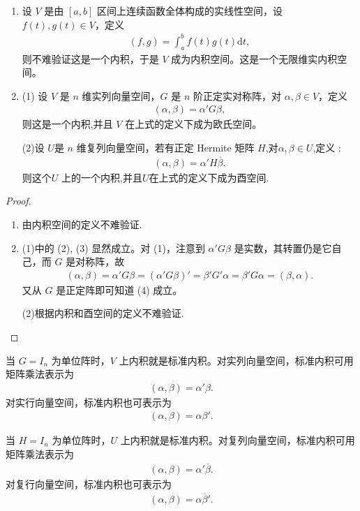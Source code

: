 \documentclass[../../main.tex]{subfiles}%
\begin{document}
\begin{example}\label{example:一些常见的内积及内积空间}
\begin{enumerate}
\item 设 \(V\) 是由 \([a,b]\) 区间上连续函数全体构成的实线性空间，设 \(f(t),g(t)\in V\)，定义
\begin{align*}
(f,g)=\int_{a}^{b}f(t)g(t)\mathrm{d}t,
\end{align*}
则不难验证这是一个内积，于是 \(V\) 成为内积空间。这是一个无限维实内积空间。

\item (1) 设 \(V\) 是 \(n\) 维实列向量空间，\(G\) 是 \(n\) 阶正定实对称阵，对 \(\alpha,\beta\in V\)，定义
\begin{align*}
(\alpha,\beta)=\alpha'G\beta,
\end{align*}
则这是一个内积,并且 \(V\) 在上式的定义下成为欧氏空间。

(2)设 \(U\)是 \(n\) 维复列向量空间，若有正定 Hermite 矩阵 \(H\),对$\alpha ,\beta \in U$,定义 :
\begin{align*}
(\alpha,\beta)=\alpha'H\overline{\beta}.
\end{align*}
则这个\(U\) 上的一个内积,并且$U$在上式的定义下成为酉空间.
\end{enumerate}
\end{example}
\begin{proof}
\begin{enumerate}
\item 由内积空间的定义不难验证.

\item (1)中的 (2), (3) 显然成立。对 (1)，注意到 \(\alpha'G\beta\) 是实数，其转置仍是它自己，而 \(G\) 是对称阵，故
\begin{align*}
(\alpha,\beta)=\alpha'G\beta=(\alpha'G\beta)'=\beta'G'\alpha=\beta'G\alpha=(\beta,\alpha).
\end{align*}
又从 \(G\) 是正定阵即可知道 (4) 成立。 

(2)根据内积和酉空间的定义不难验证.
\end{enumerate}

\end{proof}
\begin{remark}
当 \(G = I_n\) 为单位阵时，\(V\) 上内积就是标准内积。对实列向量空间，标准内积可用矩阵乘法表示为
\begin{align*}
(\alpha,\beta)=\alpha'\beta.
\end{align*}
对实行向量空间，标准内积也可表示为
\begin{align*}
(\alpha,\beta)=\alpha\beta'.
\end{align*}

当 \(H = I_n\) 为单位阵时，\(U\) 上内积就是标准内积。对复列向量空间，标准内积可用矩阵乘法表示为
\begin{align*}
(\alpha,\beta)=\alpha'\overline{\beta}.
\end{align*}
对复行向量空间，标准内积也可表示为
\begin{align*}
(\alpha,\beta)=\alpha\overline{\beta}'.
\end{align*} 
\end{remark}
\end{document}
